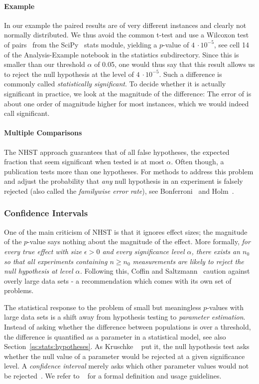 \documentclass[algorithms,article,submit,moreauthors,pdftex]{Definitions/mdpi}
\newcounter{guideline}
\newcommand{\changed}[1]{#1}
\begin{document}
\paragraph{\kad Example}
In our example the paired results are of very different instances and clearly not normally distributed.
We thus avoid the common t-test and use a Wilcoxon test of pairs~\cite{wilcoxon1945individual} from the SciPy~\cite{scipy} stats module, yielding a $p$-value of \changed{$4~\cdot 10^{-5}$}, see cell 14 of the Analysis-Example notebook in the statistics subdirectory.
Since this is smaller than our threshold $\alpha$ of 0.05, one would thus say that this result allows us to reject the null hypothesis at the level of \changed{$4~\cdot 10^{-5}$}.
Such a difference is commonly called \emph{statistically significant}.
To decide whether it is actually significant in practice, we look at the magnitude of the difference:
The error of \kad is about one order of magnitude higher for most instances, which we would \changed{indeed} call significant.

\paragraph{Multiple Comparisons}
The NHST approach guarantees that of all false hypotheses, the expected fraction that seem significant when tested is at most $\alpha$.
Often though, a publication tests more than one hypotheses.
For methods to address this problem and adjust the probability that \emph{any} null hypothesis in an experiment is falsely rejected (also called the \emph{familywise error rate}), see Bonferroni~\cite{dunn1961multiple} and Holm~\cite{holm1979bonferroni}.

\subsubsection{Confidence Intervals}
\label{sec:stats:confidence-intervals}
One of the main criticism of NHST is that it ignores effect sizes;
the magnitude of the $p$-value says nothing about the magnitude of the effect.
More formally, \emph{for every true effect with size $\epsilon > 0$ and every significance level $\alpha$,
there exists an $n_0$ so that all experiments containing $n \geq n_0$ measurements are likely to reject the null hypothesis at level $\alpha$.}
Following this, Coffin and Saltzmann~\cite{Coffin00} caution against overly large data sets - a recommendation which comes with its own set of problems.

The statistical response to the problem of small but meaningless $p$-values with large data sets is a shift away from hypothesis testing to \emph{parameter estimation}.
Instead of asking whether the difference between populations is over a threshold, the difference is quantified as a parameter in a statistical model, see also Section~\ref{ss:stats:hypotheses}.
%
As Kruschke \etal~\cite{kruschke2018bayesian} put it, the null hypothesis test asks whether the null value of a parameter would be rejected at a given significance level.
A \emph{confidence interval} merely asks which other parameter values would not be rejected~\cite{kruschke2018bayesian}.
We refer to ~\cite{smithsonCI,neyman1937x} for a formal definition and usage guidelines.
\end{document}
